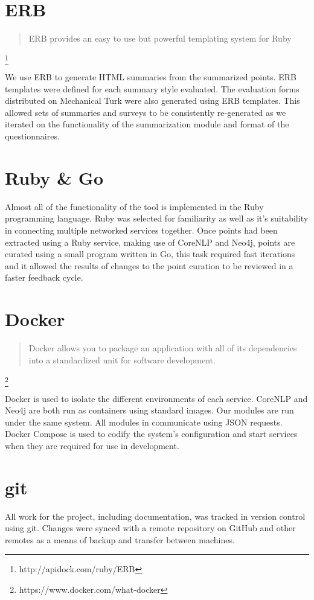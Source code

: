   \tocless\section{ERB}
    \blockquote{ERB provides an easy to use but powerful templating system for Ruby}\footnote{http://apidock.com/ruby/ERB}

    We use ERB to generate HTML summaries from the summarized points. ERB templates were defined for each summary style evaluated. The evaluation forms distributed on Mechanical Turk were also generated using ERB templates. This allowed sets of summaries and surveys to be consistently re-generated as we iterated on the functionality of the summarization module and format of the questionnaires.

  \tocless\section{Ruby \& Go}
    Almost all of the functionality of the tool is implemented in the Ruby programming language. Ruby was selected for familiarity as well as it's suitability in connecting multiple networked services together. Once points had been extracted using a Ruby service, making use of CoreNLP and Neo4j, points are curated using a small program written in Go, this task required fast iterations and it allowed the results of changes to the point curation to be reviewed in a faster feedback cycle.

  \tocless\section{Docker}
    \blockquote{Docker allows you to package an application with all of its dependencies into a standardized unit for software development.}\footnote{https://www.docker.com/what-docker}

    Docker is used to isolate the different environments of each service. CoreNLP and Neo4j are both run as containers using standard images. Our modules are run under the same system. All modules in communicate using JSON requests. Docker Compose is used to codify the system's configuration and start services when they are required for use in development.

  \tocless\section{git}
    All work for the project, including documentation, was tracked in version control using git. Changes were synced with a remote repository on GitHub and other remotes as a means of backup and transfer between machines.
